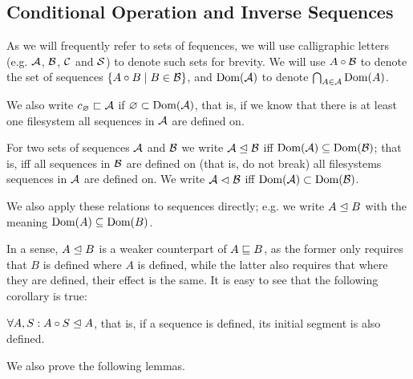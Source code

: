 

\subsection{Conditional Operation and Inverse Sequences}

\begin{mydef}
As we will frequently refer to sets of fequences,
we will use calligraphic letters (e.g. $\mathcal{A}$, $\mathcal{B}$, $\mathcal{C}$ and $\mathcal{S}$)
to denote such sets for brevity.
We will use $A\circ\mathcal{B}$ to denote the set of sequences $\{A\circ B\mathrel{|} B\in\mathcal{B}\}$,
and $\textrm{Dom}({\mathcal{A}})$ to denote $\bigcap_{A\in\mathcal{A}} \textrm{Dom}({A})$.

We also write $c_\varnothing\sqsubset{\mathcal{A}}$ if $\varnothing \subset \textrm{Dom}({\mathcal{A}})$, that is,
if we know that there is at least one filesystem
all sequences in $\mathcal{A}$ are defined on.
\end{mydef}


\begin{mydef}[$\worksmsign$, $\worksmeqsign$]\label{def_works}
For two sets of sequences $\mathcal{A}$ and $\mathcal{B}$
we write ${\mathcal{A}}\trianglelefteq{\mathcal{B}}$ iff $\textrm{Dom}({\mathcal{A}}) \subseteq \textrm{Dom}({\mathcal{B}})$;
that is, iff all sequences in $\mathcal{B}$ are defined on (that is, do not break)
all filesystems sequences in $\mathcal{A}$ are defined on.
We write ${\mathcal{A}}\vartriangleleft{\mathcal{B}}$ iff $\textrm{Dom}({\mathcal{A}}) \subset \textrm{Dom}({\mathcal{B}})$.

We also apply these relations to sequences directly;
e.g. we write
${A}\trianglelefteq{B}$ with the meaning $\textrm{Dom}({A}) \subseteq \textrm{Dom}({B})$.
\end{mydef}

In a sense, $A\trianglelefteq B$ is a weaker counterpart of $A\sqsubseteq B$, as the former
only requires that $B$ is defined where $A$ is defined, 
while the latter also requires
that where they are defined, their effect is the same.
It is easy to see that the following corollary is true:

\begin{mycor}\label{worksextpostfix}
$\forall A,S: {A\circ S}\trianglelefteq{A}$, that is, if a sequence is defined,
its initial segment is also defined.
\end{mycor}

We also prove the following lemmas.

